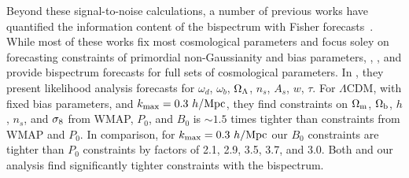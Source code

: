 Beyond these signal-to-noise calculations, a number of previous works 
have quantified the information content of the bispectrum with Fisher 
forecasts~\citep{scoccimarro2004, sefusatti2006, sefusatti2007, song2015, tellarini2016, yamauchi2017a, karagiannis2018, yankelevich2019, chudaykin2019}. 
While most of these works fix most cosmological parameters and focus soley 
on forecasting constraints of primordial non-Gaussianity and bias parameters, 
\cite{sefusatti2006}, \cite{yankelevich2019}, and \cite{chudaykin2019} provide 
bispectrum forecasts for full sets of cosmological parameters. In \cite{sefusatti2006}, 
they present likelihood analysis forecasts for $\omega_d$, $\omega_b$, $\Omega_\Lambda$, 
$n_s$, $A_s$, $w$, $\tau$. %
For $\Lambda$CDM, with fixed bias parameters, and $k_{\rm max} = 0.3~h/{\rm Mpc}$, 
they find constraints on $\Omega_{\rm m}$, $\Omega_{\rm b}$, $h$, $n_s$, and $\sigma_8$ from WMAP, 
$P_0$, and $B_0$ is $\sim 1.5$ times tighter than constraints from WMAP 
and $P_0$. In comparison, for 
$k_{\rm max} = 0.3~h/{\rm Mpc}$ our $B_0$ constraints are tighter than $P_0$ constraints 
by factors of 2.1, 2.9, 3.5, 3.7, and 3.0. Both \cite{sefusatti2006} and our 
analysis find significantly tighter constraints with the bispectrum. 

